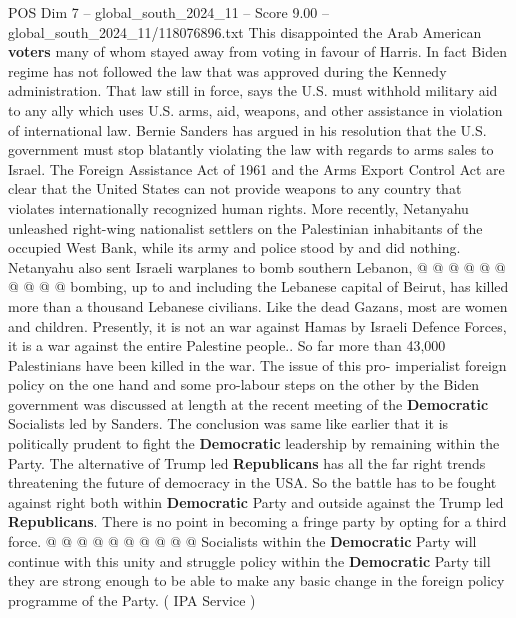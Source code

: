 \begin{textsample}{POS Dim 7 – global\_south\_2024\_11 – Score 9.00 – global\_south\_2024\_11/118076896.txt}
This disappointed the Arab American \textbf{voters} many of whom stayed away from voting in favour of Harris.
In fact Biden regime has not followed the law that was approved during the Kennedy administration.
That law still in force, says the U.S. must withhold military aid to any ally which uses U.S. arms, aid, weapons, and other assistance in violation of international law.
Bernie Sanders has argued in his resolution that the U.S. government must stop blatantly violating the law with regards to arms sales to Israel.
The Foreign Assistance Act of 1961 and the Arms Export Control Act are clear that the United States can not provide weapons to any country that violates internationally recognized human rights.
More recently, Netanyahu unleashed right-wing nationalist settlers on the Palestinian inhabitants of the occupied West Bank, while its army and police stood by and did nothing.
Netanyahu also sent Israeli warplanes to bomb southern Lebanon, @ @ @ @ @ @ @ @ @ @ bombing, up to and including the Lebanese capital of Beirut, has killed more than a thousand Lebanese civilians.
Like the dead Gazans, most are women and children.
Presently, it is not an war against Hamas by Israeli Defence Forces, it is a war against the entire Palestine people..
So far more than 43,000 Palestinians have been killed in the war.
The issue of this pro- imperialist foreign policy on the one hand and some pro-labour steps on the other by the Biden government was discussed at length at the recent meeting of the \textbf{Democratic} Socialists led by Sanders.
The conclusion was same like earlier that it is politically prudent to fight the \textbf{Democratic} leadership by remaining within the Party.
The alternative of Trump led \textbf{Republicans} has all the far right trends threatening the future of democracy in the USA.
So the battle has to be fought against right both within \textbf{Democratic} Party and outside against the Trump led \textbf{Republicans}.
There is no point in becoming a fringe party by opting for a third force. @ @ @ @ @ @ @ @ @ @ Socialists within the \textbf{Democratic} Party will continue with this unity and struggle policy within the \textbf{Democratic} Party till they are strong enough to be able to make any basic change in the foreign policy programme of the Party. ( IPA Service )

\end{textsample}

